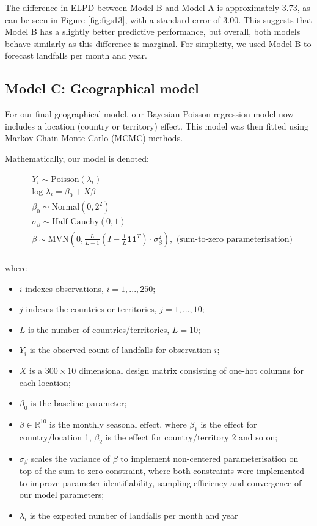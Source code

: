 \documentclass[
]{article}
\providecommand{\tightlist}{%
  \setlength{\itemsep}{0pt}\setlength{\parskip}{0pt}}
\begin{document}
The difference in ELPD between Model B and Model A is approximately 3.73, as can be seen in Figure \ref{fig:figs13}, with a standard error of 3.00. This suggests that Model B has a slightly better predictive performance, but overall, both models behave similarly as this difference is marginal. For simplicity, we used Model B to forecast landfalls per month and year.

\subsection{Model C: Geographical model}\label{model-c-geographical-model}

For our final geographical model, our Bayesian Poisson regression model now includes a location (country or territory) effect. This model was then fitted using Markov Chain Monte Carlo (MCMC) methods.

Mathematically, our model is denoted:

\begin{align*}
&Y_{i} \sim \text{Poisson}(\lambda_{i})\\
&\text{log } \lambda_{i} =  \beta_0 + X \beta\\
&\beta_0 \sim \text{Normal}(0,2^2)\\
&\sigma_{\beta} \sim \text{Half-Cauchy}(0,1)\\
&\beta \sim \text{MVN}( 0, \frac{L}{L-1}( I - \frac{1}{L} \mathbf{1}\mathbf{1}^T) \cdot \sigma_{\beta}^2), \text{ (sum-to-zero parameterisation)}\\
\end{align*}

where

\begin{itemize}
\tightlist
\item
  \(i\) indexes observations, \(i=1,...,250\);
\item
  \(j\) indexes the countries or territories, \(j = 1,...,10\);
\item
  \(L\) is the number of countries/territories, \(L=10\);
\item
  \(Y_{i}\) is the observed count of landfalls for observation \(i\);
\item
  \(X\) is a \(300 \times 10\) dimensional design matrix consisting of one-hot columns for each location;
\item
  \(\beta_0\) is the baseline parameter;
\item
  \(\beta \in \mathbb{R}^{10}\) is the monthly seasonal effect, where \(\beta_1\) is the effect for country/location 1, \(\beta_2\) is the effect for country/territory 2 and so on;
\item
  \(\sigma_{\beta}\) scales the variance of \(\beta\) to implement non-centered parameterisation on top of the sum-to-zero constraint, where both constraints were implemented to improve parameter identifiability, sampling efficiency and convergence of our model parameters;
\item
  \(\lambda_{i}\) is the expected number of landfalls per month and year
\end{itemize}
\end{document}

